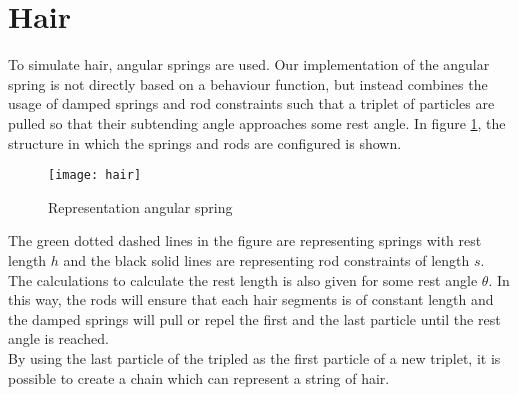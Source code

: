 \section{Hair}
To simulate hair, angular springs are used. Our implementation of the angular spring is not directly based on a behaviour function, but instead combines the usage of damped springs and rod constraints such that a triplet of particles are pulled so that their subtending angle approaches some rest angle. In figure \ref{fig:Angular Spring}, the structure in which the springs and rods are configured is shown. \\
\begin{figure}[h]
    \centering
    \texttt{[image: hair]}
    \caption{Representation angular spring}
    \label{fig:Angular Spring}
\end{figure}
The green dotted dashed lines in the figure are representing springs with rest length $h$ and the black solid lines are representing rod constraints of length $s$. The calculations to calculate the rest length is also given for some rest angle $\theta$. In this way, the rods will ensure that each hair segments is of constant length and the damped springs will pull or repel the first and the last particle until the rest angle is reached.\\
By using the last particle of the tripled as the first particle of a new triplet, it is possible to create a chain which can represent a string of hair.